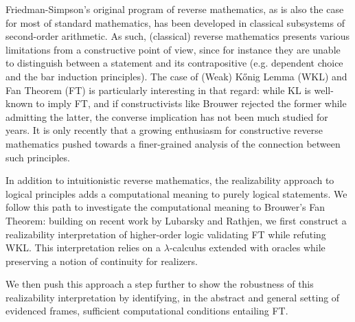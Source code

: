 Friedman-Simpson’s original program of reverse mathematics,
as is also the case for most of standard mathematics,
has been developed in classical subsystems of second-order
arithmetic. As such, (classical) reverse mathematics
presents various limitations from a constructive point of view,
since for instance they are unable to distinguish between
a statement and its contrapositive (e.g. dependent choice and
the bar induction principles).
The case of (Weak) Kőnig Lemma (WKL) and Fan Theorem (FT)
is particularly interesting in that regard:
while KL is well-known to imply FT, and if constructivists like
Brouwer rejected the former while admitting the latter,
the converse implication has not been much studied for years.
It is only recently that a growing enthusiasm for constructive reverse
mathematics pushed towards a finer-grained analysis of the connection
between such principles.

In addition to intuitionistic reverse mathematics, the realizability approach to logical principles adds a computational meaning to purely logical statements. We follow this path to investigate the computational meaning to Brouwer's Fan Theorem: building on recent work by Lubarsky and Rathjen, we first construct a realizability interpretation of higher-order logic validating FT while refuting WKL. This interpretation relies on a $\lambda$-calculus extended with oracles while preserving a notion of continuity for realizers.

We then push this approach a step further to show the robustness of this realizability interpretation by identifying, in the abstract and general setting of evidenced frames, sufficient computational conditions entailing FT.

